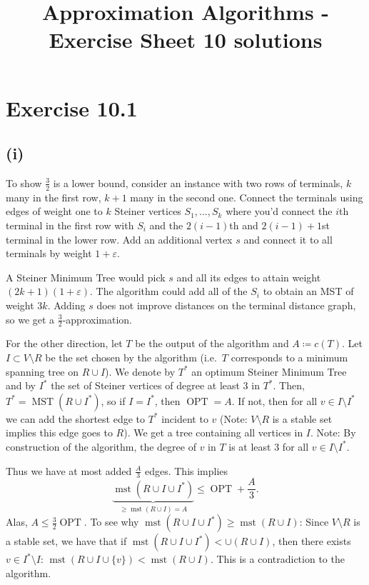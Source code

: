 \documentclass[oneside,a4paper]{amsart}
\DeclareMathOperator{\OPT}{OPT}
\DeclareMathOperator{\mst}{mst}
\DeclareMathOperator{\MST}{MST}
\begin{document}
\title{Approximation Algorithms - Exercise Sheet 10 solutions}
\maketitle{}
\section*{Exercise 10.1}
\subsection*{(i)}
To show $\frac{3}{2}$ is a lower bound, consider an instance with two rows of terminals, $k$ many in the first row, $k + 1$ many in the second one. Connect the terminals using edges of weight one to $k$ Steiner vertices $S_1, \ldots, S_k$ where you'd connect the $i$th terminal in the first row with $S_i$ and the $2(i-1)$th and $2(i-1) + 1$st terminal in the lower row. Add an additional vertex $s$ and connect it to all terminals by weight $1 + \varepsilon$.

A Steiner Minimum Tree would pick $s$ and all its edges to attain weight $(2k + 1)(1 + \varepsilon)$. The algorithm could add all of the $S_i$ to obtain an MST of weight $3k$. Adding $s$ does not improve distances on the terminal distance graph, so we get a $\frac{3}{2}$-approximation.

For the other direction, let $T$ be the output of the algorithm and $A \coloneqq c(T)$.
Let $I \subset V \setminus R$ be the set chosen by the algorithm (i.e.\ $T$ corresponds to a minimum spanning tree on $R \cup I$).
We denote by $T^*$ an optimum Steiner Minimum Tree and by $I^*$ the set of Steiner vertices of degree at least 3 in $T^*$.
Then, $T^* = \MST(R \cup I^*)$, so if $I = I^*$, then $\OPT = A$.
If not, then for all $v \in I \setminus I^*$ we can add the shortest edge to $T^*$ incident to $v$ (Note: $V \setminus R$ is a stable set implies this edge goes to $R$).
We get a tree containing all vertices in $I$.
Note: By construction of the algorithm, the degree of $v$ in $T$ is at least 3 for all $v \in I \setminus I^*$.

Thus we have at most added $\frac{A}{3}$ edges. This implies
\[
	\underbrace{ \mst(R \cup I \cup I^*) }_{\geq \mst(R \cup I) = A} \leq \OPT + \frac{A}{3}.
\]
Alas, $A \leq \frac{3}{2} \OPT$.
To see why $\mst(R \cup I \cup I^*) \geq \mst(R \cup I)$: Since $V \setminus R$ is a stable set, we have that if $\mst(R \cup I \cup I^*) < \cup(R \cup I)$, then there exists $v \in I^* \setminus I$: $\mst(R \cup I \cup \{ v \}) < \mst(R \cup I)$. This is a contradiction to the algorithm.
\end{document}
